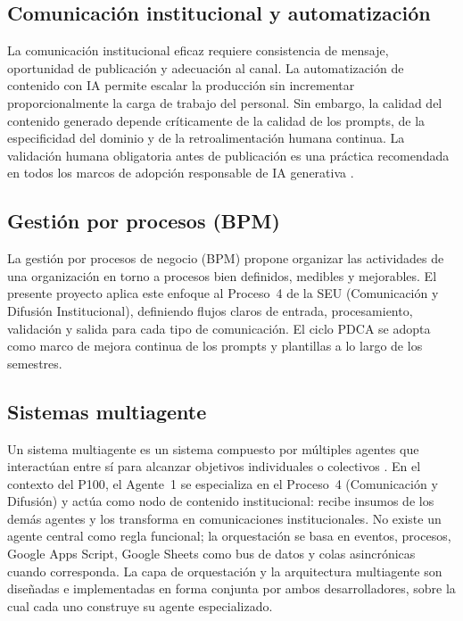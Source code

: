 \documentclass[a4paper, 12pt]{article}
\begin{document}
\subsection{Comunicaci\'on institucional y automatizaci\'on}

La comunicaci\'on institucional eficaz requiere consistencia de mensaje, oportunidad de publicaci\'on y adecuaci\'on al canal. La automatizaci\'on de contenido con IA permite escalar la producci\'on sin incrementar proporcionalmente la carga de trabajo del personal. Sin embargo, la calidad del contenido generado depende cr\'iticamente de la calidad de los prompts, de la especificidad del dominio y de la retroalimentaci\'on humana continua. La validaci\'on humana obligatoria antes de publicaci\'on es una pr\'actica recomendada en todos los marcos de adopci\'on responsable de IA generativa \parencite{russell2021}.

\subsection{Gesti\'on por procesos (BPM)}

La gesti\'on por procesos de negocio (\ac{BPM}) propone organizar las actividades de una organizaci\'on en torno a procesos bien definidos, medibles y mejorables. El presente proyecto aplica este enfoque al Proceso~4 de la \ac{SEU} (Comunicaci\'on y Difusi\'on Institucional), definiendo flujos claros de entrada, procesamiento, validaci\'on y salida para cada tipo de comunicaci\'on. El ciclo \ac{PDCA} se adopta como marco de mejora continua de los prompts y plantillas a lo largo de los semestres.

\subsection{Sistemas multiagente}

Un sistema multiagente es un sistema compuesto por m\'ultiples agentes que interact\'uan entre s\'i para alcanzar objetivos individuales o colectivos \parencite{wooldridge2009}. En el contexto del \ac{P100}, el Agente~1 se especializa en el Proceso~4 (Comunicaci\'on y Difusi\'on) y act\'ua como nodo de contenido institucional: recibe insumos de los dem\'as agentes y los transforma en comunicaciones institucionales. No existe un agente central como regla funcional; la orquestaci\'on se basa en eventos, procesos, Google Apps Script, Google Sheets como bus de datos y colas asincr\'onicas cuando corresponda. La capa de orquestaci\'on y la arquitectura multiagente son dise\~nadas e implementadas en forma conjunta por ambos desarrolladores, sobre la cual cada uno construye su agente especializado.
\end{document}
